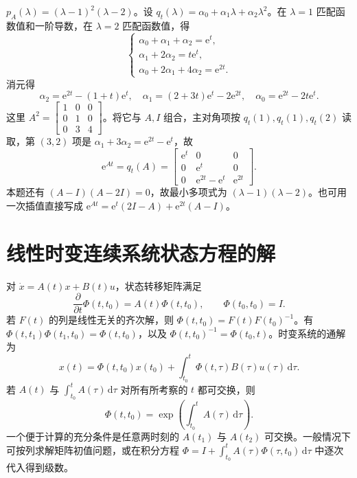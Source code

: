 

\sol $p_A(\lambda)=(\lambda-1)^2(\lambda-2)$。设 $q_t(\lambda)=\alpha_0+\alpha_1\lambda+\alpha_2\lambda^2$。在 $\lambda=1$ 匹配函数值和一阶导数，在 $\lambda=2$ 匹配函数值，得
\[
\begin{cases}
\alpha_0+\alpha_1+\alpha_2=\mathrm e^t,\\
\alpha_1+2\alpha_2=t\mathrm e^t,\\
\alpha_0+2\alpha_1+4\alpha_2=\mathrm e^{2t}.
\end{cases}
\]
消元得
\[
\alpha_2=\mathrm e^{2t}-(1+t)\mathrm e^t,\quad
\alpha_1=(2+3t)\mathrm e^t-2\mathrm e^{2t},\quad
\alpha_0=\mathrm e^{2t}-2t\mathrm e^t.
\]
这里 $A^2=\begin{bmatrix}1&0&0\\0&1&0\\0&3&4\end{bmatrix}$。将它与 $A,I$ 组合，主对角项按 $q_t(1),q_t(1),q_t(2)$ 读取，第 $(3,2)$ 项是 $\alpha_1+3\alpha_2=\mathrm e^{2t}-\mathrm e^t$，故
\[
\mathrm e^{At}=q_t(A)=\begin{bmatrix}
\mathrm e^t&0&0\\0&\mathrm e^t&0\\0&\mathrm e^{2t}-\mathrm e^t&\mathrm e^{2t}
\end{bmatrix}.
\]
本题还有 $(A-I)(A-2I)=0$，故最小多项式为 $(\lambda-1)(\lambda-2)$。也可用一次插值直接写成 $\mathrm e^{At}=\mathrm e^t(2I-A)+\mathrm e^{2t}(A-I)$。

\section{线性时变连续系统状态方程的解}

对 $\dot x=A(t)x+B(t)u$，状态转移矩阵满足
\[
\frac{\partial}{\partial t}\Phi(t,t_0)=A(t)\Phi(t,t_0),
\qquad \Phi(t_0,t_0)=I .
\]
若 $F(t)$ 的列是线性无关的齐次解，则 $\Phi(t,t_0)=F(t)F(t_0)^{-1}$。有 $\Phi(t,t_1)\Phi(t_1,t_0)=\Phi(t,t_0)$，以及 $\Phi(t,t_0)^{-1}=\Phi(t_0,t)$。时变系统的通解为
\[
x(t)=\Phi(t,t_0)x(t_0)+\int_{t_0}^{t}\Phi(t,\tau)B(\tau)u(\tau)\,\mathrm d\tau .
\]
若 $A(t)$ 与 $\int_{t_0}^{t}A(\tau)\,\mathrm d\tau$ 对所有所考察的 $t$ 都可交换，则
\[
\Phi(t,t_0)=\exp\left(\int_{t_0}^t A(\tau)\,\mathrm d\tau\right).
\]
一个便于计算的充分条件是任意两时刻的 $A(t_1)$ 与 $A(t_2)$ 可交换。一般情况下可按列求解矩阵初值问题，或在积分方程 $\Phi=I+\int_{t_0}^{t}A(\tau)\Phi(\tau,t_0)\,\mathrm d\tau$ 中逐次代入得到级数。


